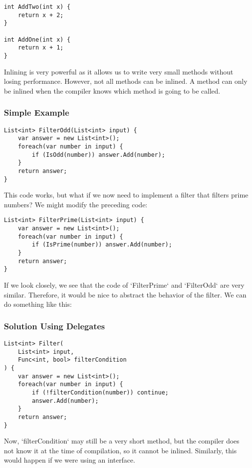 \begin{lstlisting}
int AddTwo(int x) {
    return x + 2;
}

int AddOne(int x) {
    return x + 1;
}
\end{lstlisting}

Inlining is very powerful as it allows us to write very small methods without losing performance. However, not all methods can be inlined. A method can only be inlined when the compiler knows which method is going to be called.

\subsubsection{Simple Example}
\begin{lstlisting}
List<int> FilterOdd(List<int> input) {
    var answer = new List<int>();
    foreach(var number in input) {
        if (IsOdd(number)) answer.Add(number);
    }
    return answer;
}
\end{lstlisting}

This code works, but what if we now need to implement a filter that filters prime numbers? We might modify the preceding code:

\begin{lstlisting}
List<int> FilterPrime(List<int> input) {
    var answer = new List<int>();
    foreach(var number in input) {
        if (IsPrime(number)) answer.Add(number);
    }
    return answer;
}
\end{lstlisting}

If we look closely, we see that the code of `FilterPrime` and `FilterOdd` are very similar. Therefore, it would be nice to abstract the behavior of the filter. We can do something like this:

\subsubsection{Solution Using Delegates}
\begin{lstlisting}
List<int> Filter(
    List<int> input, 
    Func<int, bool> filterCondition
) {
    var answer = new List<int>();
    foreach(var number in input) {
        if (!filterCondition(number)) continue;
        answer.Add(number);
    }
    return answer;
}
\end{lstlisting}

Now, `filterCondition` may still be a very short method, but the compiler does not know it at the time of compilation, so it cannot be inlined. Similarly, this would happen if we were using an interface.

